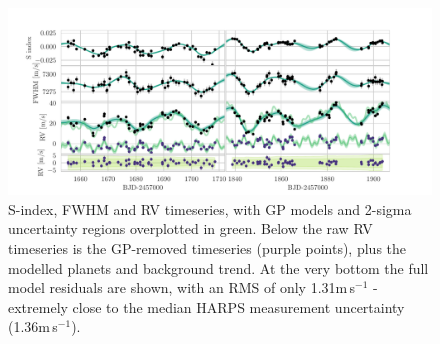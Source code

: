\documentclass[fleqn,usenatbib]{mnras}
\newcommand{\ms}{m\,s$^{-1}$}
\begin{document}
\begin{figure}
	\includegraphics[width=\textwidth, trim={0.85cm 0.8 1.9cm 0.4cm}]{Combined_RV_plots_3_GPs_nontransiting_c.pdf}
    \caption{S-index, FWHM and RV timeseries, with GP models and 2-sigma uncertainty regions overplotted in green. Below the raw RV timeseries is the GP-removed timeseries (purple points), plus the modelled planets and background trend. At the very bottom the full model residuals are shown, with an RMS of only 1.31\ms{} - extremely close to the median HARPS measurement uncertainty (1.36\ms{}).}
    \label{fig:RVs}
\end{figure}
\end{document}
